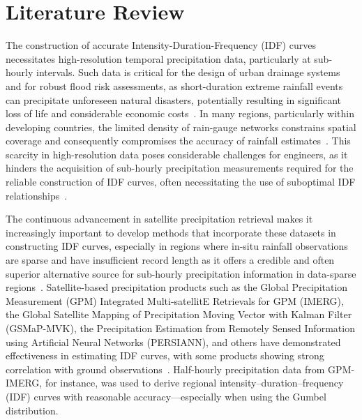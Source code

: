 \section{Literature Review}
The construction of accurate Intensity-Duration-Frequency (IDF) curves necessitates high-resolution temporal precipitation data, particularly at sub-hourly intervals. Such data is critical for the design of urban drainage systems and for robust flood risk assessments, as short-duration extreme rainfall events can precipitate unforeseen natural disasters, potentially resulting in significant loss of life and considerable economic costs~\cite{hess-28-375-2024}.
In many regions, particularly within developing countries, the limited density of rain-gauge networks constrains spatial coverage and consequently compromises the accuracy of rainfall estimates~\cite{basumatary2016}. This scarcity in high-resolution data poses considerable challenges for engineers, as it hinders the acquisition of sub-hourly precipitation measurements required for the reliable construction of IDF curves, often necessitating the use of suboptimal IDF relationships~\cite{basumatary2016}.

The continuous advancement in satellite precipitation retrieval makes it increasingly important to develop methods that incorporate these datasets in constructing IDF curves, especially in regions where in-situ rainfall observations are sparse and have insufficient record length as it offers a credible and often superior alternative source for sub-hourly precipitation information in data-sparse regions~\cite{ombadi2018}. Satellite-based precipitation products such as the Global Precipitation Measurement (GPM) Integrated Multi-satellitE Retrievals for GPM (IMERG), the Global Satellite Mapping of Precipitation Moving Vector with Kalman Filter (GSMaP-MVK), the Precipitation Estimation from Remotely Sensed Information using Artificial Neural Networks (PERSIANN), and others have demonstrated effectiveness in estimating IDF curves, with some products showing strong correlation with ground observations~\cite{ombadi2018, rs14195032}. Half-hourly precipitation data from GPM-IMERG, for instance, was used to derive regional intensity–duration–frequency (IDF) curves with reasonable accuracy—especially when using the Gumbel distribution.~\cite{rs14195032}

\vspace{1em}

